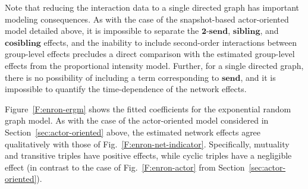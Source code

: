 \documentclass[final]{statsoc}
\begin{document}
\noindent
Note that reducing the interaction data to a single directed graph has
important modeling consequences.  As with the case of the snapshot-based
actor-oriented model detailed above, it is impossible to separate the
$\textbf{2-send}$, $\textbf{sibling}$, and $\textbf{cosibling}$ effects, and the inability to include second-order interactions between group-level effects precludes a direct comparison with the estimated group-level effects from the proportional intensity model.
Further, for a single directed graph, there is no possibility of including a
term corresponding to $\textbf{send}$, and it is impossible to quantify the
time-dependence of the network effects.

Figure~\ref{F:enron-ergm} shows the fitted coefficients for the exponential
random graph model.  As with the case of the actor-oriented model considered
in Section~\ref{sec:actor-oriented} above, the
estimated network effects agree qualitatively with those of
Fig.~\ref{F:enron-net-indicator}.  Specifically, mutuality and transitive
triples have positive effects, while cyclic triples have a negligible effect
(in contrast to the case of Fig.~\ref{F:enron-actor} from
Section~\ref{sec:actor-oriented}).
\end{document}
